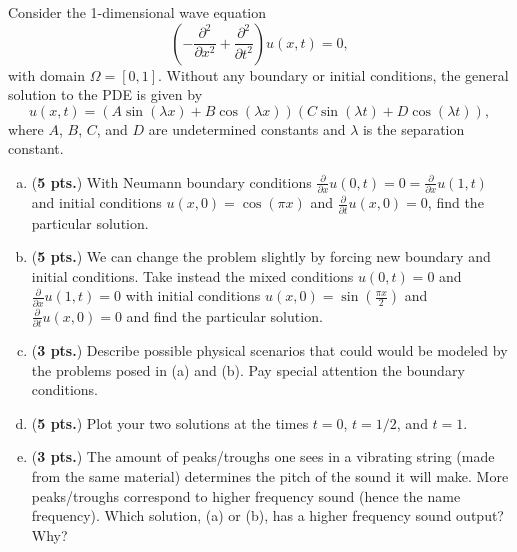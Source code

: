 \documentclass[12pt]{amsbook}
\begin{document}
\newpage
\begin{problem}
Consider the 1-dimensional wave equation
\[
\left(-\frac{\partial^2}{\partial x^2} + \frac{\partial^2}{\partial t^2}\right)u(x,t) = 0,
\]
with domain $\Omega = [0,1]$. Without any boundary or initial conditions, the general solution to the PDE is given by 
    \[
    u(x,t) = \left( A \sin(\lambda x) + B \cos(\lambda x) \right) \left(C \sin(\lambda t) + D\cos(\lambda t)\right),
    \]
    where $A$, $B$, $C$, and $D$ are undetermined constants and $\lambda$ is the separation constant.
\vspace*{.5cm}
\begin{enumerate}[(a)]
    \item (\textbf{5 pts.}) With Neumann boundary conditions $\frac{\partial}{\partial x}u(0,t) =0 = \frac{\partial}{\partial x}u(1,t)$ and initial conditions $u(x,0)=\cos(\pi x)$ and $\frac{\partial}{\partial t} u(x,0)=0$, find the particular solution.  
    \vspace*{.5cm}
    \item (\textbf{5 pts.}) We can change the problem slightly by forcing new boundary and initial conditions.  Take instead the mixed conditions $u(0,t)=0$ and $\frac{\partial}{\partial x} u(1,t) = 0$ with initial conditions $u(x,0)=\sin\left(\frac{\pi x}{2}\right)$ and $\frac{\partial}{\partial t} u(x,0)=0$ and find the particular solution.
    \vspace*{.5cm}
    \item (\textbf{3 pts.}) Describe possible physical scenarios that could would be modeled by the problems posed in (a) and (b).  Pay special attention the boundary conditions.
    \vspace*{.5cm}
    \item (\textbf{5 pts.}) Plot your two solutions at the times $t=0$, $t=1/2$, and $t=1$. 
    \vspace*{.5cm}
    \item (\textbf{3 pts.}) The amount of peaks/troughs one sees in a vibrating string (made from the same material) determines the pitch of the sound it will make.  More peaks/troughs correspond to higher frequency sound (hence the name frequency).  Which solution, (a) or (b), has a higher frequency sound output? Why?
\end{enumerate}
\end{problem}
\end{document}
